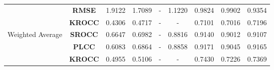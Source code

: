 \begin{sidewaystable}[htb]
\begin{tabular}{m{1.7cm}|c||c|c|c|c|c|c|m{1cm}}
             &\textbf{RMSE}&1.9122&1.7089&-&1.1220&0.9824&0.9902&0.9354\\[1ex]
             &\textbf{KROCC}&0.4306&0.4717&-&-&0.7101&0.7016&0.7196\\[1ex]
             \hline\hline
             \multirow{4}{4em}{Weighted Average}&\textbf{SROCC}&0.6647&0.6982&-&0.8816&0.9140&0.9012&0.9107\\[1ex]
             &\textbf{PLCC}&0.6083&0.6864&-&0.8858&0.9171&0.9045&0.9165\\[1ex]
             &\textbf{KROCC}&0.4955&0.5106&-&-&0.7430&0.7226&0.7369\\[1ex]
             \hline\hline
        \end{tabular}\hspace*{-1cm}
\end{sidewaystable}
